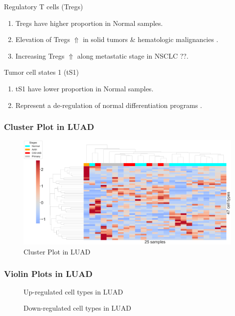\documentclass{beamer}
\begin{document}
\begin{frame}[allowframebreaks]
        \begin{block}{Regulatory T cells (Tregs)}
            \begin{enumerate}
                \item Tregs have higher proportion in Normal samples.
                \item Elevation of Tregs $\Uparrow$ in solid tumors \& hematologic malignancies \cite{Tregs-1}.
                \item Increasing Tregs $\Uparrow$ along metastatic stage in NSCLC \cite{Tregs-2} ??.
            \end{enumerate}
        \end{block}

        \begin{block}{Tumor cell states 1 (tS1)}
            \begin{enumerate}
                \item tS1 have lower proportion in Normal samples.
                \item Represent a de-regulation of normal differentiation programs \cite{singlecell1}.
            \end{enumerate}
        \end{block}
    \end{frame}

    \begin{frame}
        \frametitle{Cluster Plot in LUAD}

        \begin{figure}
            \includegraphics[width=0.9 \linewidth]{figures/BisqueRNA/clustermap/STAR.FPKM.GSE131907.ADC.pdf}
            \caption{Cluster Plot in LUAD}
        \end{figure}
    \end{frame}

    \begin{frame}[allowframebreaks]
        \frametitle{Violin Plots in LUAD}

        \begin{figure}
            \caption{Up-regulated cell types in LUAD}
        \end{figure}

        \begin{figure}
            \caption{Down-regulated cell types in LUAD}
        \end{figure}
    \end{frame}
\end{document}
